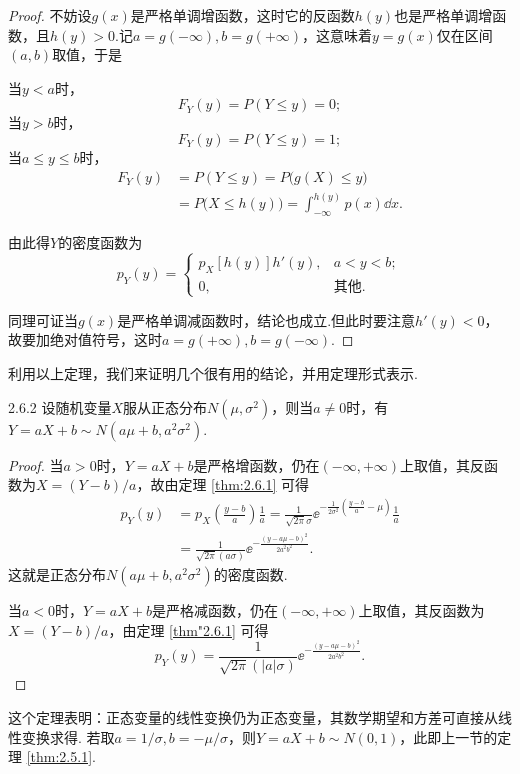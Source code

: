 \begin{proof}
  不妨设$g(x)$是严格单调增函数，这时它的反函数$h(y)$也是严格单调增函数，且$h(y)>0$.记$a=g(-\infty),b=g(+\infty)$，这意味着$y=g(x)$仅在区间$(a,b)$取值，于是

  当$y<a$时，
  \[
    F_Y(y) = P(Y\le y) = 0 ;
  \]
  当$y>b$时，
  \[
    F_Y(y) = P(Y\le y) = 1;
  \]
  当$a\le y\le b$时，
  \begin{align*}
    F_Y(y) & = P(Y\le y) = P\big( g(X) \le y \big) \\
    & = P\big( X\le h(y) \big) = \int_{-\infty}^{h(y)} p(x) \dd x.
  \end{align*}

  由此得$Y$的密度函数为
  \[
    p_Y(y) = \begin{cases}
      p_X[h(y)]h'(y), & a < y < b; \\
      0, & \text{其他}.
    \end{cases}
  \]

  同理可证当$g(x)$是严格单调减函数时，结论也成立.但此时要注意$h'(y)<0$，故要加绝对值符号，这时$a=g(+\infty),b=g(-\infty)$.
\end{proof}

利用以上定理，我们来证明几个很有用的结论，并用定理形式表示.

\begin{theorem}{}{2.6.2}
  设随机变量$X$服从正态分布$N(\mu,\sigma^2)$，则当$a\ne 0$时，有$Y=aX+b\sim N(a\mu+b,a^2\sigma^2)$.
\end{theorem}
\begin{proof}
  当$a>0$时，$Y=aX+b$是严格增函数，仍在$(-\infty,+\infty)$上取值，其反函数为$X=(Y-b)/a$，故由定理 \ref{thm:2.6.1} 可得
  \begin{align*}
    p_Y(y) & = p_X\left(\frac{y-b}a\right) \frac1a = \frac1{\sqrt{2\pi}\sigma} \ee^{-\frac1{2\sigma^2}\left( \frac{y-b}a-\mu \right)} \frac1 a\\
    & = \frac1{\sqrt{2\pi}(a\sigma)} \ee^{-\frac{(y-a\mu-b)^2}{2a^2b^2}}.
  \end{align*}
  这就是正态分布$N(a\mu+b,a^2\sigma^2)$的密度函数.

  当$a<0$时，$Y=aX+b$是严格减函数，仍在$(-\infty,+\infty)$上取值，其反函数为$X=(Y-b)/a$，由定理 \ref{thm"2.6.1} 可得
  \[
    p_Y(y) = \frac1{\sqrt{2\pi}(|a|\sigma)} \ee^{-\frac{(y-a\mu-b)^2}{2a^2b^2}}.
  \]
\end{proof}

这个定理表明：正态变量的线性变换仍为正态变量，其数学期望和方差可直接从线性变换求得. 若取$a=1/\sigma,b=-\mu/\sigma$，则$Y=aX+b\sim N(0,1)$，此即上一节的定理 \ref{thm:2.5.1}.

